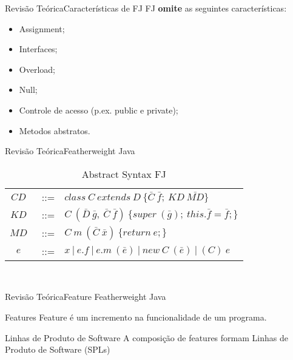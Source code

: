 \documentclass{beamer}
\begin{document}
	\begin{frame}{Revisão Teórica}{Características de FJ}
		FJ \textbf{omite} as seguintes características:
		\begin{itemize}
			\item Assignment;
			\item Interfaces;
			\item Overload;
			\item Null;
			\item Controle de acesso (p.ex. public e private);
			\item Metodos abstratos.
		\end{itemize}
	 \end{frame}
	
	\begin{frame}{Revisão Teórica}{Featherweight Java}
		\centering
		\begin{table}[ht!]
			\caption{Abstract Syntax FJ}
			\begin{tabular}{ccl}
				$CD$&~::= & $class\ C~extends~D\ \{\bar{C} \ \bar{f};\ KD\
				\bar{MD}\}$\\ 
				\vspace{0.8mm}
				$KD$&~::= &
				$C~(\bar{D}~\bar{g},\ \bar{C}~\bar{f})\
				\{super~(\bar{g});~this.\bar{f}=\bar{f};\}$\\
				\vspace{0.8mm}
				$MD$&~::= & $C~m~(\bar{C}~\bar{x})\ \{return~e;\}$\\
				\vspace{0.8mm}
				$e$&~::= & $x~|~e.f~|~e.m~(\bar{e})~|~new~C~(\bar{e})~|~(C)~e$ \\
			\end{tabular} \\
			\vspace{1.5mm}
			\label{abstractsyntax}
		\end{table}
	\end{frame}
	
	\begin{frame}{Revisão Teórica}{Feature Featherweight Java}
		\centering
		\begin{block}{Features}
			Feature é um incremento na funcionalidade de um programa.
		\end{block}
		\begin{block}{Linhas de Produto de Software}
			A composição de features formam Linhas de Produto de Software (SPLs)
		\end{block}
	\end{frame}	
	
\end{document}
